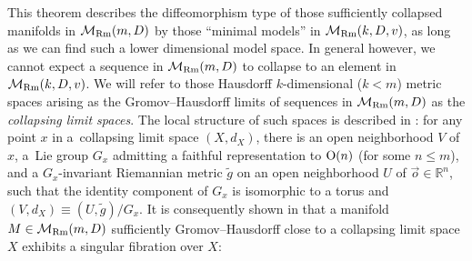 \documentclass[10pt,a4paper]{amsart}
\numberwithin{equation}{section}
\begin{document}
This theorem describes the diffeomorphism type of those
sufficiently collapsed manifolds in $\mathcal{M}_{\rm Rm}(m,D)$ by those ``minimal
models'' in $\mathcal{M}_{\rm Rm}(k,D,v)$, as long as we can find such a lower
dimensional model space. In general however, we cannot expect a sequence in
$\mathcal{M}_{\rm Rm}(m,D)$ to collapse to an element
in $\mathcal{M}_{\rm Rm}(k,D,v)$. We will refer to those Hausdorff $k$-dimensional
($k<m$) metric spaces arising as the Gromov--Hausdorff limits of sequences in
$\mathcal{M}_{\rm Rm}(m,D)$ as the \emph{collapsing limit spaces}. The local
structure of such spaces is described in \cite[Theorem~0.5]{Fukaya88}: for any
point $x$ in a~collapsing limit space $(X,d_X)$, there is an open neighborhood
$V$ of $x$, a~Lie group $G_x$ admitting a faithful representation to ${\rm O}(n)$ (for
some $n\le m$), and a $G_x$-invariant Riemannian metric $\tilde{g}$ on an open
neighborhood $U$ of $\vec{o}\in \mathbb{R}^n$, such that the identity component
of $G_x$ is isomorphic to a torus and $(V,d_X)\equiv (U,\tilde{g})\slash G_x$.
It is consequently shown in \cite{CFG92, Fukaya88, Fukaya89} that a manifold $M\in \mathcal{M}_{\rm Rm}(m,D)$ sufficiently
Gromov--Hausdorff close to a collapsing limit space $X$ exhibits a singular
fibration over $X$:
\end{document}
